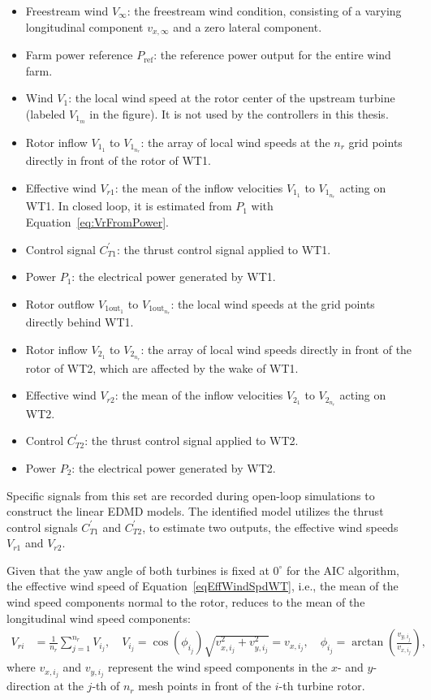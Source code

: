 \begin{itemize}
    \item Freestream wind $V_\infty$: the freestream wind condition, consisting of a varying longitudinal component $v_{x,\infty}$ and a zero lateral component.
    \item Farm power reference $P_{\text{ref}}$: the reference power output for the entire wind farm.
    \item Wind $V_1$: the local wind speed at the rotor center of the upstream turbine (labeled $V_{1_m}$ in the figure). It is not used by the controllers in this thesis.
    \item Rotor inflow $V_{1_1}$ to $V_{1_{n_r}}$: the array of local wind speeds at the $n_r$ grid points directly in front of the rotor of WT1.
    \item Effective wind $V_{r1}$: the mean of the inflow velocities $V_{1_1}$ to $V_{1_{n_r}}$ acting on WT1. In closed loop, it is estimated from $P_1$ with Equation~\eqref{eq:VrFromPower}.
    \item Control signal $C_{T1}^{\prime}$: the thrust control signal applied to WT1.
    \item Power $P_1$: the electrical power generated by WT1.
    \item Rotor outflow $V_{1\text{out}_1}$ to $V_{1\text{out}_{n_r}}$: the local wind speeds at the grid points directly behind WT1.
    \item Rotor inflow $V_{2_1}$ to $V_{2_{n_r}}$: the array of local wind speeds directly in front of the rotor of WT2, which are affected by the wake of WT1.
    \item Effective wind $V_{r2}$: the mean of the inflow velocities $V_{2_1}$ to $V_{2_{n_r}}$ acting on WT2.
    \item Control $C_{T2}^{\prime}$: the thrust control signal applied to WT2.
    \item Power $P_2$: the electrical power generated by WT2.
\end{itemize}
Specific signals from this set are recorded during open-loop simulations to construct the linear EDMD models. The identified model utilizes  the thrust control signals $C_{T1}^{\prime}$ and $C_{T2}^{\prime}$, to estimate two outputs, the effective wind speeds $V_{r1}$ and $V_{r2}$.


Given that the yaw angle of both turbines is fixed at $0^\circ$ for the AIC algorithm, the effective wind speed of Equation~\eqref{eqEffWindSpdWT}, i.e., the mean of the wind speed components normal to the rotor, reduces to the mean of the longitudinal wind speed components:
\begin{align} \label{eqEffWindSpdWTAIC}
    V_{ri} &=  \frac{1}{n_r} \sum_{j = 1}^{n_r} V_{i_j},  
    \quad  V_{i_j} = \cos(\phi_{i_j}) \sqrt{v_{x,i_j}^2 + v_{y,i_j}^2} = v_{x,i_j},
    \quad \phi_{i_j} = \arctan\left(\frac{v_{y,i_j}}{v_{x,i_j}}\right),
\end{align}
where $v_{x,i_j}$ and $v_{y,i_j}$ represent the wind speed components in the $x$- and $y$-direction at the $j$-th of $n_r$ mesh points in front of the $i$-th turbine rotor.

